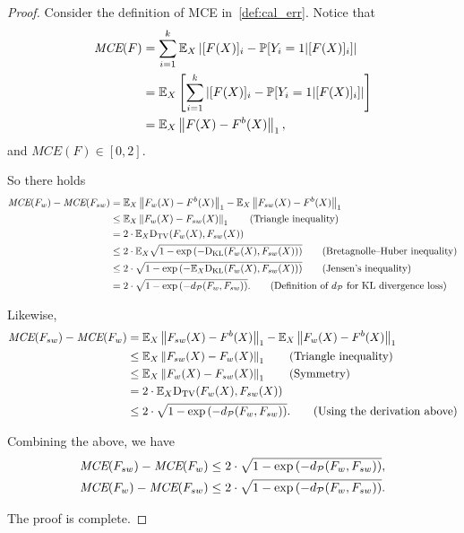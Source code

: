 \begin{proof}

Consider the definition of MCE in~\cref{def:cal_err}.
Notice that
\begin{align*}
    \textit{MCE}(F) & = \sum_{i=1}^k \mathbb{E}_X \left| [F(X)]_i-\mathbb{P}[Y_i=1|[F(X)]_i] \right| \\ & = \mathbb{E}_X \left[ \sum_{i=1}^k \left| [F(X)]_i-\mathbb{P}[Y_i=1|[F(X)]_i] \right| \right] \\
    & = \mathbb{E}_X \left\| F(X)-F^b(X) \right\|_1,
\end{align*}
and $\textit{MCE}(F) \in [0,2]$.

So there holds
\begin{align*}
    \textit{MCE}(F_w) - \textit{MCE}(F_{sw}) & = \expect_X \left\| F_w(X)-F^b(X) \right\|_1 - \expect_X \left\| F_{sw}(X)-F^b(X) \right\|_1 \\
    & \le \expect_X \left\| F_w(X)-F_{sw}(X) \right\|_1 \tag{Triangle inequality} \\
    & = 2 \cdot \expect_X \tv(F_w(X), F_{sw}(X)) \\
    & \le 2 \cdot \expect_X \sqrt{1-\exp{\left(-\mathrm{D}_{\mathrm{KL}}(F_w(X),F_{sw}(X))\right)}} \tag{Bretagnolle–Huber inequality} \\
    & \le 2 \cdot \sqrt{1-\exp{\left(-\expect_X \mathrm{D}_{\mathrm{KL}}(F_w(X),F_{sw}(X))\right)}} \tag{Jensen’s inequality} \\
    & = 2 \cdot \sqrt{1-\exp{\left(-\dist(F_w,F_{sw})\right)}}. \tag{Definition of $\dist$ for KL divergence loss}
\end{align*}

Likewise,
\begin{align*}
    \textit{MCE}(F_{sw}) - \textit{MCE}(F_w) & = \mathbb{E}_X \left\| F_{sw}(X)-F^b(X) \right\|_1 - \mathbb{E}_X \left\| F_w(X)-F^b(X) \right\|_1 \\
    & \le \mathbb{E}_X \left\| F_{sw}(X)-F_w(X) \right\|_1 \tag{Triangle inequality} \\
    & \le \mathbb{E}_X \left\| F_w(X)-F_{sw}(X) \right\|_1 \tag{Symmetry} \\
    & = 2 \cdot \mathbb{E}_X \mathrm{D}_{\mathrm{TV}}(F_w(X), F_{sw}(X)) \\
    & \le 2 \cdot \sqrt{1-\exp{\left(-d_\mathcal{P}(F_w,F_{sw})\right)}}. \tag{Using the derivation above}
\end{align*}

Combining the above, we have
\begin{align*}
    & \textit{MCE}(F_{sw}) - \textit{MCE}(F_w) \le 2 \cdot \sqrt{1-\exp{\left(-d_\mathcal{P}(F_w,F_{sw})\right)}}, \\
    & \textit{MCE}(F_w) - \textit{MCE}(F_{sw}) \le 2 \cdot \sqrt{1-\exp{\left(-d_\mathcal{P}(F_w,F_{sw})\right)}}.
\end{align*}

The proof is complete.

\end{proof}










